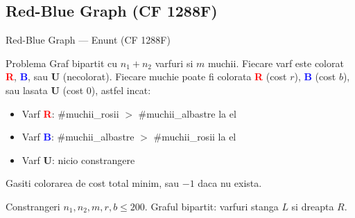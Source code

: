 ﻿\documentclass[9pt]{beamer}
\begin{document}
\subsection*{Red-Blue Graph (CF 1288F)}

\begin{frame}{Red-Blue Graph --- Enunt (CF 1288F)}
  \begin{block}{Problema}
    Graf bipartit cu $n_1+n_2$ varfuri si $m$ muchii. Fiecare varf este colorat
    \textcolor{red}{\textbf{R}}, \textcolor{blue}{\textbf{B}}, sau \textbf{U} (necolorat).
    Fiecare muchie poate fi colorata \textcolor{red}{\textbf{R}} (cost $r$),
    \textcolor{blue}{\textbf{B}} (cost $b$), sau lasata \textbf{U} (cost $0$), astfel incat:
    \begin{itemize}
      \item Varf \textcolor{red}{\textbf{R}}: \#muchii\_rosii $>$ \#muchii\_albastre la el
      \item Varf \textcolor{blue}{\textbf{B}}: \#muchii\_albastre $>$ \#muchii\_rosii la el
      \item Varf \textbf{U}: nicio constrangere
    \end{itemize}
    Gasiti colorarea de cost total minim, sau $-1$ daca nu exista.
  \end{block}
  \begin{exampleblock}{Constrangeri}
    \footnotesize
    $n_1, n_2, m, r, b \leq 200$. Graful bipartit: varfuri stanga $L$ si dreapta $R$.
  \end{exampleblock}
\end{frame}
\end{document}
